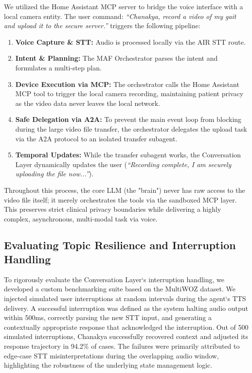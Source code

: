 \documentclass[conference]{IEEEtran}
\begin{document}
We utilized the Home Assistant MCP server to bridge the voice interface with a local camera entity. The user command: \textit{``Chanakya, record a video of my gait and upload it to the secure server.''} triggers the following pipeline:
\begin{enumerate}
    \item \textbf{Voice Capture \& STT:} Audio is processed locally via the AIR STT route.
    \item \textbf{Intent \& Planning:} The MAF Orchestrator parses the intent and formulates a multi-step plan.
    \item \textbf{Device Execution via MCP:} The orchestrator calls the Home Assistant MCP tool to trigger the local camera recording, maintaining patient privacy as the video data never leaves the local network.
    \item \textbf{Safe Delegation via A2A:} To prevent the main event loop from blocking during the large video file transfer, the orchestrator delegates the upload task via the A2A protocol to an isolated transfer subagent.
    \item \textbf{Temporal Updates:} While the transfer subagent works, the Conversation Layer dynamically updates the user (\textit{``Recording complete, I am securely uploading the file now...''}).
\end{enumerate}

Throughout this process, the core LLM (the "brain") never has raw access to the video file itself; it merely orchestrates the tools via the sandboxed MCP layer. This preserves strict clinical privacy boundaries while delivering a highly complex, asynchronous, multi-modal task via voice.



\subsection{Evaluating Topic Resilience and Interruption Handling}
To rigorously evaluate the Conversation Layer`s interruption handling, we developed a custom benchmarking suite based on the MultiWOZ dataset. We injected simulated user interruptions at random intervals during the agent`s TTS delivery. A successful interruption was defined as the system halting audio output within 500ms, correctly parsing the new STT input, and generating a contextually appropriate response that acknowledged the interruption. Out of 500 simulated interruptions, Chanakya successfully recovered context and adjusted its response trajectory in 94.2\% of cases. The failures were primarily attributed to edge-case STT misinterpretations during the overlapping audio window, highlighting the robustness of the underlying state management logic.
\end{document}

